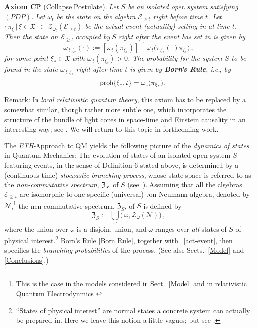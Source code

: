 \documentclass[12pt]{article}
\begin{document}
{\bf{Axiom CP}} (Collapse Postulate).\label{collapseaxiom} \textit{Let $S$ be an isolated open system satisfying $(PDP)$. Let
$\omega_t$ be the state on the algebra $\mathcal{E}_{\geq t}$ right \textit{before} time $t$. Let 
$\big\{ \pi_{\xi} \,|\, \xi \in \mathfrak{X} \big\} \subset \mathcal{Z}_{\omega_t}(\mathcal{E}_{\geq t})$ be the actual event (actuality) setting in at time $t$. Then the state on $\mathcal{E}_{\geq t}$ occupied by $S$ right \textit{after} the event has set in is given by 
$$
\omega_{\,t, \xi_{*}}(\cdot):=[\omega_{\,t}(\pi_{\xi_{*}})]^{-1}\,\omega_{\,t}\big(\pi_{\xi_{*}} (\cdot) \pi_{\xi_{*}}\big) \,,
$$
for some point $\xi_{*} \in \mathfrak{X}$ with $\omega_{\,t}(\pi_{\xi_{*}})>0$. The probability for the system $S$ to be found in the state $\omega_{\,t,\xi_{*}}$ right \textit{after} time $t$ is given by {\bf{Born's Rule}}, i.e., by}
\begin{equation}\label{Born Rule}
\hspace{4.9cm}\text{\rm{prob}}\{\xi_{*}, t\} = \omega_{\,t}(\pi_{\xi_{*}}). \hspace{4.5cm} \square
\vspace{0.2cm}
\end{equation}

{Remark}: In \textit{local relativistic quantum theory}, this axiom has to be replaced by a somewhat similar, though
rather more subtle one, which incorporates the structure of the bundle of light cones in space-time and Einstein causality in an 
interesting way; see \cite{Fr2}. We will return to this topic in forthcoming work. 

The \textit{ETH}-Approach to QM yields the following picture of the \textit{dynamics of states} in Quantum Mechanics: 
The evolution of states of an isolated open system $S$ featuring events, in the sense of Definition 6 stated above, 
is determined by a (continuous-time) \textit{stochastic branching process}, whose state space is referred to 
as the {\em{non-commutative spectrum}}, $\mathfrak{Z}_{S}$, of $S$ (see~\cite{Fr1}). Assuming that all the algebras 
$\mathcal{E}_{\geq t}$ are isomorphic to one specific (universal) von Neumann algebra, denoted by $\mathcal{N}$,\footnote{This is the case in the models considered in Sect.~\ref{Model} and in relativistic Quantum Electrodynmics  \cite{Buchholz}} the non-commutative spectrum, $\mathfrak{Z}_{S}$, of $S$ is defined by
\begin{equation}\label{NCspect}
\mathfrak{Z}_{S}:= \bigcup_{\omega} \Big(\,\omega, \mathcal{Z}_{\omega}(\mathcal{N})\Big)\,, 
\end{equation}
where the union over $\omega$ is a disjoint union, and $\omega$ ranges over \textit{all} states of $S$ of physical interest.\footnote{``States of physical interest'' are normal states a concrete system can actually be prepared in. Here we leave this notion a little vagues; but see \cite{Haag, Fr-Schub}.}
Born's Rule \eqref{Born Rule}, together with ~\eqref{act-event}, then specifies the \textit{branching probabilities} 
of the process. (See also Sects.~\ref{Model} and \ref{Conclusions}.)\\
\end{document}
